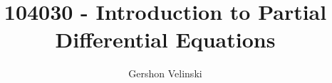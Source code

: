 \documentclass[]{article}
\title{104030 - Introduction to Partial Differential Equations}
\author{Gershon Velinski}
\begin{document}
\maketitle

\begin{abstract}

\end{abstract}






\end{document}
